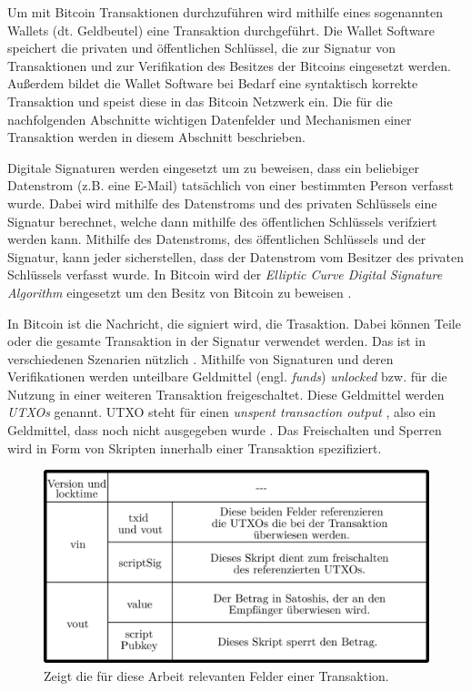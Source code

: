 \documentclass[ngerman,runningheads,a4paper]{llncs}[2018/03/10]
\begin{document}
Um mit Bitcoin Transaktionen durchzuführen wird mithilfe eines sogenannten Wallets (dt. Geldbeutel) eine Transaktion durchgeführt. Die Wallet Software speichert die privaten und öffentlichen Schlüssel, die zur Signatur von Transaktionen und zur Verifikation des Besitzes der Bitcoins eingesetzt werden. Außerdem bildet die Wallet Software bei Bedarf eine syntaktisch korrekte Transaktion und speist diese in das Bitcoin Netzwerk ein. Die für die nachfolgenden Abschnitte wichtigen Datenfelder und Mechanismen einer Transaktion werden in diesem Abschnitt beschrieben.

Digitale Signaturen werden eingesetzt um zu beweisen, dass ein beliebiger Datenstrom (z.B. eine E-Mail) tatsächlich von einer bestimmten Person verfasst wurde. Dabei wird mithilfe des Datenstroms und des privaten Schlüssels eine Signatur berechnet, welche dann mithilfe des öffentlichen Schlüssels verifziert werden kann. Mithilfe des Datenstroms, des öffentlichen Schlüssels und der Signatur, kann jeder sicherstellen, dass der Datenstrom vom Besitzer des privaten Schlüssels verfasst wurde. In Bitcoin wird der \textit{Elliptic Curve Digital Signature Algorithm} eingesetzt um den Besitz von Bitcoin zu beweisen \citep{bitcoinbook}.

In Bitcoin ist die Nachricht, die signiert wird, die Trasaktion. Dabei können Teile oder die gesamte Transaktion in der Signatur verwendet werden. Das ist in verschiedenen Szenarien nützlich \citep{bitcoinbook}. Mithilfe von Signaturen und deren Verifikationen werden unteilbare Geldmittel (engl. \textit{funds}) \textit{unlocked} bzw. für die Nutzung in einer weiteren Transaktion freigeschaltet. Diese Geldmittel werden \textit{UTXOs} genannt. UTXO steht für einen \textit{unspent transaction output} \citep{bitcoinbook}, also ein Geldmittel, dass noch nicht ausgegeben wurde . Das Freischalten und Sperren wird in Form von Skripten innerhalb einer Transaktion spezifiziert. 

\begin{figure}
  \centering
  \includegraphics[width=.8\textwidth]{grafiken/tableTransaction.png}
  \caption{Zeigt die für diese Arbeit relevanten Felder einer Transaktion.}
  \label{fig:transactionTable}
\end{figure}
\end{document}
